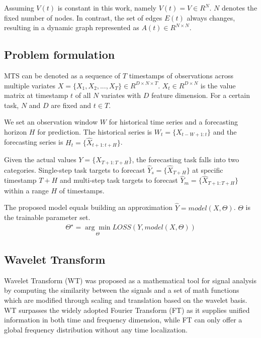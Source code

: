 \documentclass[final,12pt]{elsarticle}
\begin{document}
Assuming $V(t)$ is constant in this work, namely $V(t) = V \in R^{N}$.
$N$ denotes the fixed number of nodes.  %
In contrast, the set of edges $E(t)$ always changes, 
resulting in a dynamic graph represented as $A(t) \in R^{N \times N}$.  %


\subsection{Problem formulation}
\label{subsec-3.2}


MTS can be denoted as 
a sequence of $T$ timestamps of observations across multiple variates 
$X = \{ X_1, X_2, ... , X_T \} \in R^{D \times N \times T}$.
$X_t \in R^{D \times N}$ is the value matrix at timestamp $t$ 
of all $N$ variates with $D$ feature dimension.
For a certain task, $N$ and $D$ are fixed and $t \in T$.  %

We set an observation window $W$ for historical time series 
and a forecasting horizon $H$ for prediction.  %
The historical series is $W_{t} = \{ X_{t-W+1:t} \}$  %
and the forecasting series is $H_{t} = \{ \widehat{X}_{t+1:t+H} \}$.  %

Given the actual values $Y = \{ X_{T+1:T+H} \}$, 
the forecasting task falls into two categories.  %
Single-step task 
targets to forecast $\widehat{Y}_{s} = \{ \widehat{X}_{T+H} \}$ 
at specific timestamp $T+H$ 
and multi-step task 
targets to forecast $\widehat{Y}_{m} = \{ \widehat{X}_{T+1:T+H} \}$ 
within a range $H$ of timestamps.

The proposed model equals building an approximation 
$\widehat{Y} = model(X, \Theta)$.
$\Theta$ is the trainable parameter set.
\begin{equation}
  \begin{aligned}
    \Theta^{\star} = \underset{\Theta}{\arg\min} LOSS(Y, model(X, \Theta))
  \end{aligned}
\end{equation}


\subsection{Wavelet Transform}
\label{subsec-3.3}


Wavelet Transform (WT) \cite{daubechies1992ten} was proposed 
as a mathematical tool for signal analysis 
by computing the similarity between the signals and a set of math functions 
which are modified through scaling and translation based on the wavelet basis.  %
WT surpasses the widely adopted Fourier Transform (FT) 
as it supplies unified information in both time and frequency dimension, 
while FT can only offer a global frequency distribution 
without any time localization.  %
\end{document}
